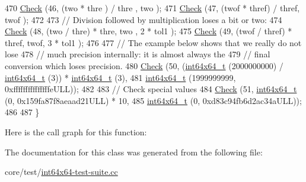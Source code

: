 \begin{DoxyCode}
470   \hyperlink{classns3_1_1int64x64_1_1test_1_1Int64x64ArithmeticTestCase_a471c01814da4b0b5c4082b7ce1c46dfe}{Check} (46, (two  * thre ) / thre , two  );
471   \hyperlink{classns3_1_1int64x64_1_1test_1_1Int64x64ArithmeticTestCase_a471c01814da4b0b5c4082b7ce1c46dfe}{Check} (47, (twof * thref) / thref, twof );
472 
473   \textcolor{comment}{// Division followed by multiplication loses a bit or two:}
474   \hyperlink{classns3_1_1int64x64_1_1test_1_1Int64x64ArithmeticTestCase_a471c01814da4b0b5c4082b7ce1c46dfe}{Check} (48, (two  / thre)  * thre,  two , 2 * tol1 );
475   \hyperlink{classns3_1_1int64x64_1_1test_1_1Int64x64ArithmeticTestCase_a471c01814da4b0b5c4082b7ce1c46dfe}{Check} (49, (twof / thref) * thref, twof, 3 * tol1 );
476 
477   \textcolor{comment}{// The example below shows that we really do not lose}
478   \textcolor{comment}{// much precision internally: it is almost always the}
479   \textcolor{comment}{// final conversion which loses precision.}
480   \hyperlink{classns3_1_1int64x64_1_1test_1_1Int64x64ArithmeticTestCase_a471c01814da4b0b5c4082b7ce1c46dfe}{Check} (50, (\hyperlink{classint64x64__t}{int64x64\_t} (2000000000) / \hyperlink{classint64x64__t}{int64x64\_t} (3)) * 
      \hyperlink{classint64x64__t}{int64x64\_t} (3),
481               \hyperlink{classint64x64__t}{int64x64\_t} (1999999999, 0xfffffffffffffffeULL));
482 
483   \textcolor{comment}{// Check special values}
484   \hyperlink{classns3_1_1int64x64_1_1test_1_1Int64x64ArithmeticTestCase_a471c01814da4b0b5c4082b7ce1c46dfe}{Check} (51,  \hyperlink{classint64x64__t}{int64x64\_t} (0, 0x159fa87f8aeaad21ULL) * 10,
485                    \hyperlink{classint64x64__t}{int64x64\_t} (0, 0xd83c94fb6d2ac34aULL));
486   
487 \}
\end{DoxyCode}


Here is the call graph for this function\+:




The documentation for this class was generated from the following file\+:\begin{DoxyCompactItemize}
\item 
core/test/\hyperlink{int64x64-test-suite_8cc}{int64x64-\/test-\/suite.\+cc}\end{DoxyCompactItemize}
